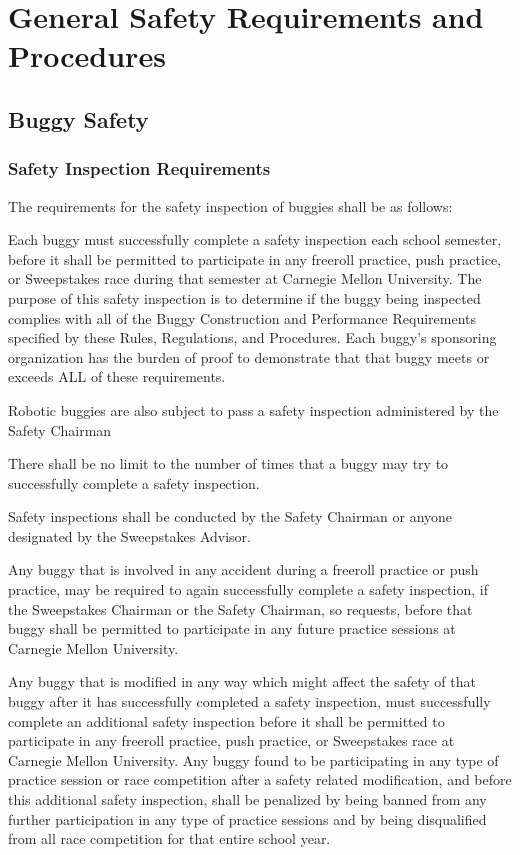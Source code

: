 \chapter{General Safety Requirements and Procedures}

\section{Buggy Safety}

\subsection{Safety Inspection Requirements}

	The requirements for the safety inspection of buggies shall be as follows:
	\newline

	Each buggy must successfully complete a safety inspection each school semester, before it shall be permitted to participate in any freeroll practice, push practice, or Sweepstakes race during that semester at Carnegie Mellon University. The purpose of this safety inspection is to determine if the buggy being inspected complies with all of the Buggy Construction and Performance Requirements specified by these Rules, Regulations, and Procedures. Each buggy's sponsoring organization has the burden of proof to demonstrate that that buggy meets or exceeds ALL of these requirements.

        Robotic buggies are also subject to pass a safety inspection administered by the Safety Chairman

	There shall be no limit to the number of times that a buggy may try to successfully complete a safety inspection.

	Safety inspections shall be conducted by the Safety Chairman or anyone designated by the Sweepstakes Advisor.

	Any buggy that is involved in any accident during a freeroll practice or push practice, may be required to again successfully complete a safety inspection, if the Sweepstakes Chairman or the Safety Chairman, so requests, before that buggy shall be permitted to participate in any future practice sessions at Carnegie Mellon University.

	Any buggy that is modified in any way which might affect the safety of that buggy after it has successfully completed a safety inspection, must successfully complete an additional safety inspection before it shall be permitted to participate in any freeroll practice, push practice, or Sweepstakes race at Carnegie Mellon University. Any buggy found to be participating in any type of practice session or race competition after a safety related modification, and before this additional safety inspection, shall be penalized by being banned from any further participation in any type of practice sessions and by being disqualified from all race competition for that entire school year.


